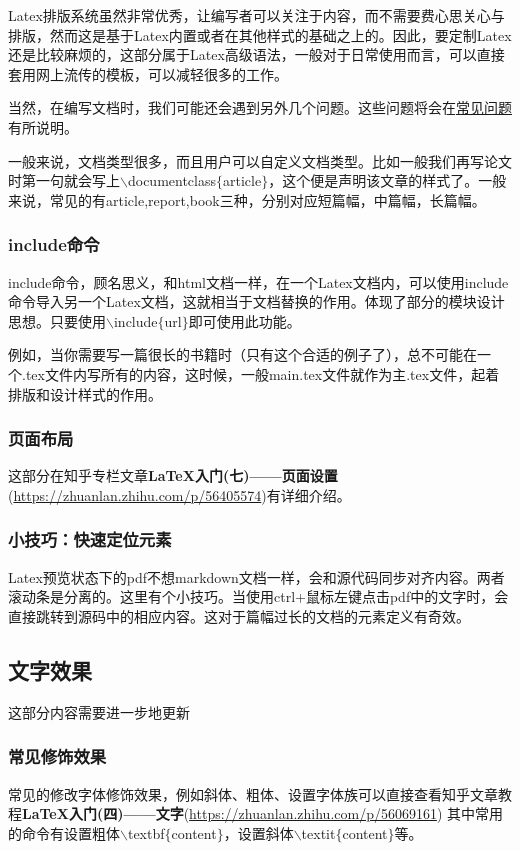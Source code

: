 \documentclass{article}
\begin{document}
                Latex排版系统虽然非常优秀，让编写者可以关注于内容，而不需要费心思关心与排版，然而这是基于Latex内置或者在其他样式的基础之上的。因此，要定制Latex还是比较麻烦的，这部分属于Latex高级语法，一般对于日常使用而言，可以直接套用网上流传的模板，可以减轻很多的工作。

                当然，在编写文档时，我们可能还会遇到另外几个问题。这些问题将会在\hyperlink{other-question}{常见问题}有所说明。

                一般来说，文档类型很多，而且用户可以自定义文档类型。比如一般我们再写论文时第一句就会写上$\backslash$documentclass$\lbrace$article$\rbrace$，这个便是声明该文章的样式了。一般来说，常见的有article,report,book三种，分别对应短篇幅，中篇幅，长篇幅。
            \subsubsection{include命令}
                include命令，顾名思义，和html文档一样，在一个Latex文档内，可以使用include命令导入另一个Latex文档，这就相当于文档替换的作用。体现了部分的模块设计思想。只要使用$\backslash$include$\lbrace$url$\rbrace$即可使用此功能。
                
                例如，当你需要写一篇很长的书籍时（只有这个合适的例子了），总不可能在一个.tex文件内写所有的内容，这时候，一般main.tex文件就作为主.tex文件，起着排版和设计样式的作用。
            \subsubsection{页面布局}
                这部分在知乎专栏文章\textbf{LaTeX入门(七)——页面设置}(\url{https://zhuanlan.zhihu.com/p/56405574})有详细介绍。
            \subsubsection{小技巧：快速定位元素}
                Latex预览状态下的pdf不想markdown文档一样，会和源代码同步对齐内容。两者滚动条是分离的。这里有个小技巧。当使用ctrl+鼠标左键点击pdf中的文字时，会直接跳转到源码中的相应内容。这对于篇幅过长的文档的元素定义有奇效。
        \subsection{文字效果}
            这部分内容需要进一步地更新
            \subsubsection{常见修饰效果}
                常见的修改字体修饰效果，例如斜体、粗体、设置字体族可以直接查看知乎文章教程\textbf{LaTeX入门(四)——文字}(\url{https://zhuanlan.zhihu.com/p/56069161})
                其中常用的命令有设置粗体$\backslash$textbf$\lbrace$content$\rbrace$，设置斜体$\backslash$textit$\lbrace$content$\rbrace$等。
\end{document}

